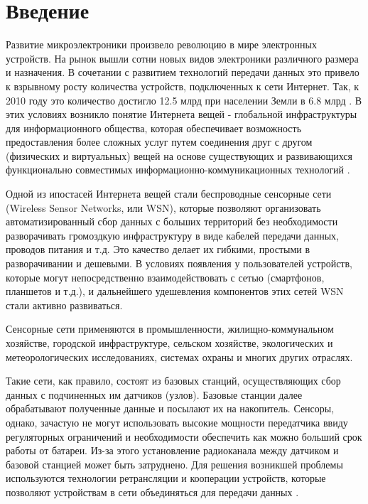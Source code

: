 \documentclass[a4paper,12pt,oneside, abstract=true]{scrartcl}
\begin{document}
\section{Введение}
Развитие микроэлектроники произвело революцию в мире электронных устройств. 
На рынок вышли сотни новых видов электроники различного размера и назначения. 
В сочетании с развитием технологий передачи данных это привело к взрывному росту количества устройств, подключенных к сети Интернет. 
Так, к 2010 году это количество достигло 12.5 млрд при населении Земли в 6.8 млрд \cite{A1}. 
В этих условиях возникло понятие Интернета вещей - глобальной инфраструктуры для информационного общества, которая обеспечивает возможность предоставления более сложных услуг путем соединения друг с другом (физических и виртуальных) вещей на основе существующих и развивающихся функционально совместимых информационно-коммуникационных технологий \cite{A2}.


Одной из ипостасей Интернета вещей стали беспроводные сенсорные сети (Wireless Sensor Networks, или WSN), которые позволяют организовать автоматизированный сбор данных с больших территорий без необходимости разворачивать громоздкую инфраструктуру в виде кабелей передачи данных, проводов питания и т.д. 
Это качество делает их гибкими, простыми в разворачивании и дешевыми. 
В условиях появления у пользователей устройств, которые могут непосредственно взаимодействовать с сетью (смартфонов, планшетов и т.д.), и дальнейшего удешевления компонентов этих сетей WSN стали активно развиваться.

Сенсорные сети применяются в промышленности, жилищно-коммунальном хозяйстве, городской инфраструктуре, сельском хозяйстве, экологических и метеорологических исследованиях, системах охраны и многих других отраслях.


Такие сети, как правило, состоят из базовых станций, осуществляющих сбор данных с подчиненных им датчиков (узлов). 
Базовые станции далее обрабатывают полученные данные и посылают их на накопитель.
Сенсоры, однако, зачастую не могут использовать высокие мощности передатчика ввиду регуляторных ограничений и необходимости обеспечить как можно больший срок работы от батареи. 
Из-за этого установление радиоканала между датчиком и базовой станцией может быть затруднено. 
Для решения возникшей проблемы используются технологии ретрансляции и кооперации устройств, которые позволяют устройствам в сети объединяться для передачи данных \cite{B1}.
\end{document}

